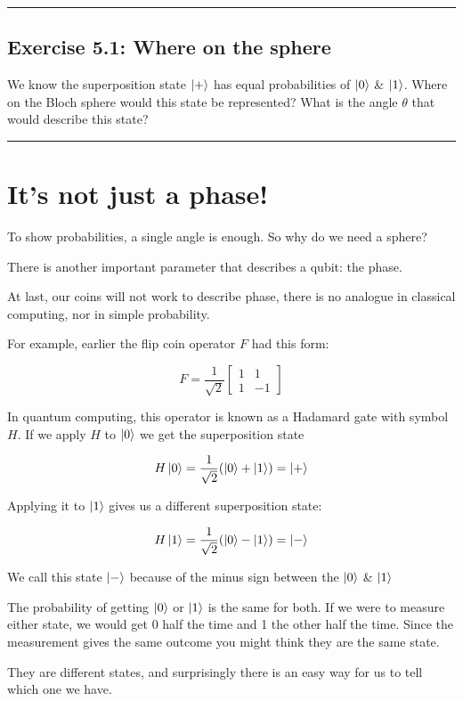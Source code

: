 \documentclass{book}
\begin{document}
\hrule
\subsection{Exercise 5.1: Where on the sphere}

We know the superposition state $\ket{+}$ has equal probabilities of $\ket{0}$ \& $\ket{1}$. Where on the Bloch sphere would this state be represented? What is the angle $\theta$ that would describe this state?

\hrule

\section{It's not just a phase!} 

To show probabilities, a single angle is enough. So why do we need a sphere? 

There is another important parameter that describes a qubit: the phase. 

At last, our coins will not work to describe phase, there is no analogue in classical computing, nor in simple probability.

For example, earlier the flip coin operator $F$ had this form:

$$
F =  \frac{1}{\sqrt{2}} \begin{bmatrix} 1 & 1 \\ 1 & -1 \end{bmatrix}
$$

In quantum computing, this operator is known as a Hadamard gate with symbol $H$. 
If we apply $H$ to $\ket{0}$ we get the superposition state 

$$
H\ket{0} = \frac{1}{\sqrt{2}} ( \ket{0} + \ket{1}) = \ket{+}
$$

Applying it to $\ket{1}$ gives us a different superposition state: 

$$
H\ket{1} = \frac{1}{\sqrt{2}} ( \ket{0} - \ket{1}) = \ket{-}
$$

We call this state $\ket{-}$ because of the minus sign between the $\ket{0}$ \& $\ket{1}$

The probability of getting $\ket{0}$ or $\ket{1}$ is the same for both. If we were to measure either state, we would get 0 half the time and 1 the other half the time. Since the measurement gives the same outcome you might think they are the same state. 
 
They are different states, and surprisingly there is an easy way for us to tell which one we have. 
\end{document}
